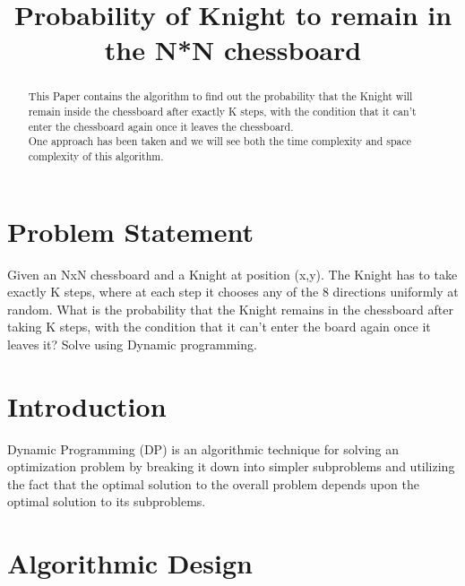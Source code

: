 \documentclass[conference]{IEEEtran}
\begin{document}
\title{ Probability of Knight to remain in the N*N chessboard\\
}
\author{
\and
{}
\and
{}
}

\maketitle

\begin{abstract}
This Paper contains the algorithm to find out the probability that the Knight will remain inside the chessboard after exactly K steps, with the condition that it can't enter the chessboard again once it leaves the chessboard.\\ One approach has been taken and we will see both the time complexity and space complexity of this algorithm.
\end{abstract}

\section{Problem Statement}
Given an NxN chessboard and a Knight at position (x,y). The Knight has to
take exactly K steps, where at each step it chooses any of the 8 directions
uniformly at random. What is the probability that the Knight remains in
the chessboard after taking K steps, with the condition that it can’t enter
the board again once it leaves it? Solve using Dynamic programming.

\section{Introduction}
Dynamic Programming (DP) is an algorithmic technique for solving an optimization problem by breaking it down into simpler subproblems and utilizing the fact that the optimal solution to the overall problem depends upon the optimal solution to its subproblems. \\

\section{Algorithmic Design}
\end{document}
